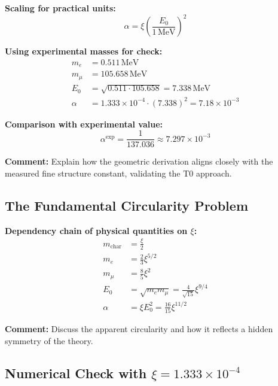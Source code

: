 \documentclass[12pt,a4paper]{article}
\newcommand{\xipar}{\xi}            %
\newcommand{\alphagem}{\alpha}      %
\newcommand{\mchar}{m_{\text{char}}} %
\newcommand{\Ezero}{E_0}            %
\begin{document}
\textbf{Scaling for practical units:}
\begin{equation}
	\alphagem = \xipar \left( \frac{\Ezero}{1\,\text{MeV}} \right)^2
\end{equation}

\textbf{Using experimental masses for check:}
\begin{align}
	m_e &= 0.511\,\text{MeV} \\
	m_\mu &= 105.658\,\text{MeV} \\
	\Ezero &= \sqrt{0.511 \cdot 105.658} = 7.338\,\text{MeV} \\
	\alphagem &= 1.333 \times 10^{-4} \cdot (7.338)^2 = 7.18 \times 10^{-3}
\end{align}

\textbf{Comparison with experimental value:}
\begin{equation}
	\alphagem^{\text{exp}} = \frac{1}{137.036} \approx 7.297 \times 10^{-3}
\end{equation}

\textbf{Comment:} Explain how the geometric derivation aligns closely with the measured fine structure constant, validating the T0 approach.

\subsection{The Fundamental Circularity Problem}

\textbf{Dependency chain of physical quantities on $\xipar$:}
\begin{align}
	\mchar &= \frac{\xipar}{2} \\
	m_e &= \frac{2}{3} \xipar^{5/2} \\
	m_\mu &= \frac{8}{5} \xipar^2 \\
	\Ezero &= \sqrt{m_e m_\mu} = \frac{4}{\sqrt{15}} \xipar^{9/4} \\
	\alphagem &= \xipar \Ezero^2 = \frac{16}{15} \xipar^{11/2}
\end{align}

\textbf{Comment:} Discuss the apparent circularity and how it reflects a hidden symmetry of the theory.

\subsection{Numerical Check with $\xipar = 1.333 \times 10^{-4}$}
\end{document}

